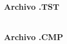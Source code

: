 \documentclass[12pt]{article}
\begin{document}
  	\subsubsection{Archivo .TST}
  	\begin{lstlisting}

  	\end{lstlisting}
  	\subsubsection{Archivo .CMP}
  	\begin{lstlisting}

  	\end{lstlisting}

\newpage
\printbibliography[heading=bibintoc]
\end{document}
